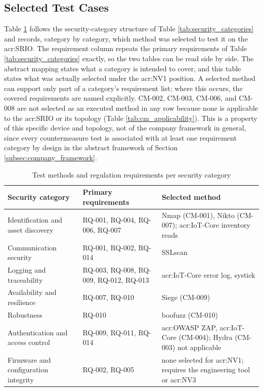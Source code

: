 \subsection{Selected Test Cases}
\label{subsec:cm_tc_map}
Table \ref{tab:cm_tc_map} follows the security-category structure of Table \ref{tab:security_categories} and records, category by category, which method was selected to test it on the \gls{acr:SRIO}. The requirement column repeats the primary requirements of Table \ref{tab:security_categories} exactly, so the two tables can be read side by side. The abstract mapping states what a category is intended to cover, and this table states what was actually selected under the \gls{acr:NV1} position. A selected method can support only part of a category's requirement list; where this occurs, the covered requirements are named explicitly. CM-002, CM-003, CM-006, and CM-008 are not selected as an executed method in any row because none is applicable to the \gls{acr:SRIO} or its topology (Table \ref{tab:cm_applicability}). This is a property of this specific device and topology, not of the company framework in general, since every countermeasure test is associated with at least one requirement category by design in the abstract framework of Section \ref{subsec:company_framework}.

\begin{table}[H]
	\caption{Test methods and regulation requirements per security category}
	\label{tab:cm_tc_map}
	\centering
	\begin{tabularx}{\textwidth}{l X X}
		\toprule
		\textbf{Security category} & \textbf{Primary requirements} & \textbf{Selected method} \\
		\midrule
		Identification and asset discovery & RQ-001, RQ-004, RQ-006, RQ-007 & Nmap (CM-001), Nikto (CM-007); \gls{acr:IoT}-Core inventory reads \\
		\addlinespace
		Communication security & RQ-001, RQ-002, RQ-014 & SSLscan  \\
		\addlinespace
		Logging and traceability & RQ-003, RQ-008, RQ-009, RQ-012, RQ-013 & \gls{acr:IoT}-Core error log, systick \\
		\addlinespace
		Availability and resilience & RQ-007, RQ-010 & Siege (CM-009) \\
		\addlinespace
		Robustness & RQ-010 & boofuzz (CM-010) \\
		\addlinespace
		Authentication and access control & RQ-009, RQ-011, RQ-014 & \gls{acr:OWASP} ZAP, \gls{acr:IoT}-Core (CM-004); Hydra (CM-003) not applicable \\
		\addlinespace
		Firmware and configuration integrity & RQ-002, RQ-005 & none selected for \gls{acr:NV1}; requires the engineering tool or \gls{acr:NV3} \\
		\bottomrule
	\end{tabularx}
\end{table}




